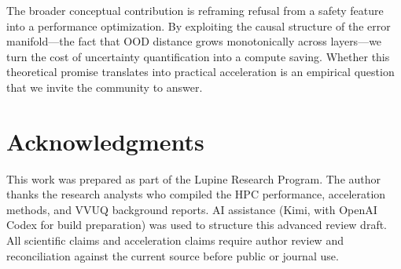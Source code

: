 \documentclass[11pt,a4paper]{article}
\begin{document}
The broader conceptual contribution is reframing refusal from a safety feature into a performance optimization. By exploiting the causal structure of the error manifold---the fact that OOD distance grows monotonically across layers---we turn the cost of uncertainty quantification into a compute saving. Whether this theoretical promise translates into practical acceleration is an empirical question that we invite the community to answer.

\section*{Acknowledgments}

This work was prepared as part of the Lupine Research Program. The author thanks the research analysts who compiled the HPC performance, acceleration methods, and VVUQ background reports.
AI assistance (Kimi, with OpenAI Codex for build preparation) was used to
structure this advanced review draft. All scientific claims and acceleration
claims require author review and reconciliation against the current source
before public or journal use.
\end{document}
